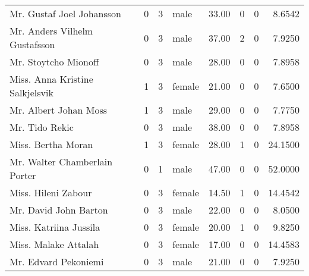 \begin{tabular}{lrrlrrrr}
Mr. Gustaf Joel Johansson                          &         0 &       3 &    male &  33.00 &                        0 &                        0 &    8.6542 \\
Mr. Anders Vilhelm Gustafsson                      &         0 &       3 &    male &  37.00 &                        2 &                        0 &    7.9250 \\
Mr. Stoytcho Mionoff                               &         0 &       3 &    male &  28.00 &                        0 &                        0 &    7.8958 \\
Miss. Anna Kristine Salkjelsvik                    &         1 &       3 &  female &  21.00 &                        0 &                        0 &    7.6500 \\
Mr. Albert Johan Moss                              &         1 &       3 &    male &  29.00 &                        0 &                        0 &    7.7750 \\
Mr. Tido Rekic                                     &         0 &       3 &    male &  38.00 &                        0 &                        0 &    7.8958 \\
Miss. Bertha Moran                                 &         1 &       3 &  female &  28.00 &                        1 &                        0 &   24.1500 \\
Mr. Walter Chamberlain Porter                      &         0 &       1 &    male &  47.00 &                        0 &                        0 &   52.0000 \\
Miss. Hileni Zabour                                &         0 &       3 &  female &  14.50 &                        1 &                        0 &   14.4542 \\
Mr. David John Barton                              &         0 &       3 &    male &  22.00 &                        0 &                        0 &    8.0500 \\
Miss. Katriina Jussila                             &         0 &       3 &  female &  20.00 &                        1 &                        0 &    9.8250 \\
Miss. Malake Attalah                               &         0 &       3 &  female &  17.00 &                        0 &                        0 &   14.4583 \\
Mr. Edvard Pekoniemi                               &         0 &       3 &    male &  21.00 &                        0 &                        0 &    7.9250 \\

\end{tabular}
